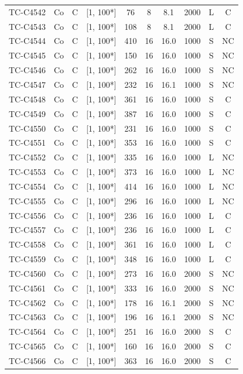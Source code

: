 \begin{longtable}{lccccccccc}
TC-C4542 & Co & C & [1, 100*] & 76 & 8 & 8.1 & 2000 & L & C \\
TC-C4543 & Co & C & [1, 100*] & 108 & 8 & 8.1 & 2000 & L & C \\
TC-C4544 & Co & C & [1, 100*] & 410 & 16 & 16.0 & 1000 & S & NC \\
TC-C4545 & Co & C & [1, 100*] & 150 & 16 & 16.0 & 1000 & S & NC \\
TC-C4546 & Co & C & [1, 100*] & 262 & 16 & 16.0 & 1000 & S & NC \\
TC-C4547 & Co & C & [1, 100*] & 232 & 16 & 16.1 & 1000 & S & NC \\
TC-C4548 & Co & C & [1, 100*] & 361 & 16 & 16.0 & 1000 & S & C \\
TC-C4549 & Co & C & [1, 100*] & 387 & 16 & 16.0 & 1000 & S & C \\
TC-C4550 & Co & C & [1, 100*] & 231 & 16 & 16.0 & 1000 & S & C \\
TC-C4551 & Co & C & [1, 100*] & 353 & 16 & 16.0 & 1000 & S & C \\
TC-C4552 & Co & C & [1, 100*] & 335 & 16 & 16.0 & 1000 & L & NC \\
TC-C4553 & Co & C & [1, 100*] & 373 & 16 & 16.0 & 1000 & L & NC \\
TC-C4554 & Co & C & [1, 100*] & 414 & 16 & 16.0 & 1000 & L & NC \\
TC-C4555 & Co & C & [1, 100*] & 296 & 16 & 16.0 & 1000 & L & NC \\
TC-C4556 & Co & C & [1, 100*] & 236 & 16 & 16.0 & 1000 & L & C \\
TC-C4557 & Co & C & [1, 100*] & 236 & 16 & 16.0 & 1000 & L & C \\
TC-C4558 & Co & C & [1, 100*] & 361 & 16 & 16.0 & 1000 & L & C \\
TC-C4559 & Co & C & [1, 100*] & 348 & 16 & 16.0 & 1000 & L & C \\
TC-C4560 & Co & C & [1, 100*] & 273 & 16 & 16.0 & 2000 & S & NC \\
TC-C4561 & Co & C & [1, 100*] & 333 & 16 & 16.0 & 2000 & S & NC \\
TC-C4562 & Co & C & [1, 100*] & 178 & 16 & 16.1 & 2000 & S & NC \\
TC-C4563 & Co & C & [1, 100*] & 196 & 16 & 16.1 & 2000 & S & NC \\
TC-C4564 & Co & C & [1, 100*] & 251 & 16 & 16.0 & 2000 & S & C \\
TC-C4565 & Co & C & [1, 100*] & 160 & 16 & 16.0 & 2000 & S & C \\
TC-C4566 & Co & C & [1, 100*] & 363 & 16 & 16.0 & 2000 & S & C \\

\end{longtable}
